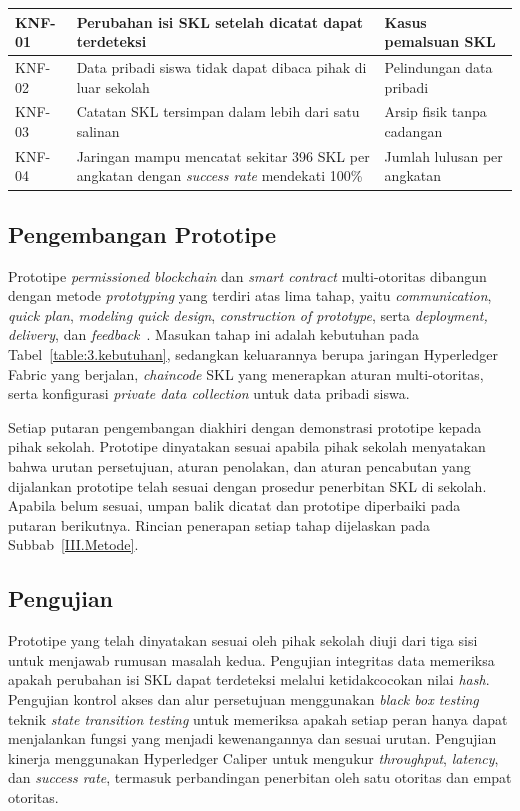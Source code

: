 \begin{table}[H]
\begin{tabular}{|>{\raggedright\arraybackslash}p{}|>{\raggedright\arraybackslash}p{}|>{\raggedright\arraybackslash}p{}|}
        \hline
        KNF-01 & Perubahan isi SKL setelah dicatat dapat terdeteksi & Kasus pemalsuan SKL \\
        \hline
        KNF-02 & Data pribadi siswa tidak dapat dibaca pihak di luar sekolah & Pelindungan data pribadi~\cite{UU27Tahun2022} \\
        \hline
        KNF-03 & Catatan SKL tersimpan dalam lebih dari satu salinan & Arsip fisik tanpa cadangan \\
        \hline
        KNF-04 & Jaringan mampu mencatat sekitar 396 SKL per angkatan dengan \textit{success rate} mendekati 100\% & Jumlah lulusan per angkatan \\
        \hline
    \end{tabular}
\end{table}

\subsection{Pengembangan Prototipe}
Prototipe \textit{permissioned blockchain} dan \textit{smart contract} multi-otoritas dibangun dengan metode \textit{prototyping} yang terdiri atas lima tahap, yaitu \textit{communication}, \textit{quick plan}, \textit{modeling quick design}, \textit{construction of prototype}, serta \textit{deployment, delivery}, dan \textit{feedback}~\cite{Adim2025Prototype}. Masukan tahap ini adalah kebutuhan pada Tabel~\ref{table:3.kebutuhan}, sedangkan keluarannya berupa jaringan Hyperledger Fabric yang berjalan, \textit{chaincode} SKL yang menerapkan aturan multi-otoritas, serta konfigurasi \textit{private data collection} untuk data pribadi siswa.

Setiap putaran pengembangan diakhiri dengan demonstrasi prototipe kepada pihak sekolah. Prototipe dinyatakan sesuai apabila pihak sekolah menyatakan bahwa urutan persetujuan, aturan penolakan, dan aturan pencabutan yang dijalankan prototipe telah sesuai dengan prosedur penerbitan SKL di sekolah. Apabila belum sesuai, umpan balik dicatat dan prototipe diperbaiki pada putaran berikutnya. Rincian penerapan setiap tahap dijelaskan pada Subbab~\ref{III.Metode}.

\subsection{Pengujian}
Prototipe yang telah dinyatakan sesuai oleh pihak sekolah diuji dari tiga sisi untuk menjawab rumusan masalah kedua. Pengujian integritas data memeriksa apakah perubahan isi SKL dapat terdeteksi melalui ketidakcocokan nilai \textit{hash}. Pengujian kontrol akses dan alur persetujuan menggunakan \textit{black box testing} teknik \textit{state transition testing} untuk memeriksa apakah setiap peran hanya dapat menjalankan fungsi yang menjadi kewenangannya dan sesuai urutan. Pengujian kinerja menggunakan Hyperledger Caliper untuk mengukur \textit{throughput}, \textit{latency}, dan \textit{success rate}, termasuk perbandingan penerbitan oleh satu otoritas dan empat otoritas.

